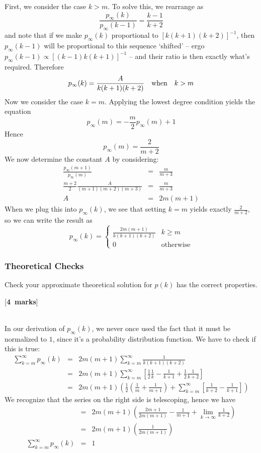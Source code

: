 \documentclass[a4paper,12pt]{article}
\newcounter{nmarks}
\newcommand{\qmarks}[1]{\addtocounter{nmarks}{#1} }
\renewcommand{\qmarks}[1]{\addtocounter{nmarks}{#1} \hspace*{\fill} [\textbf{#1~marks}]}
\begin{document}
First, we consider the case $k>m$. To solve this, we rearrange as
$$\frac{p_\infty(k)}{p_\infty(k-1)}=\frac{k-1}{k+2}$$
and note that if we make $p_\infty(k)$ proportional to $\left[k(k+1)(k+2)\right]^{-1}$, then $p_\infty(k-1)$ will be proportional to this sequence `shifted' -- ergo $p_\infty(k-1)\propto \left[(k-1)k(k+1)\right]^{-1}$ -- and their ratio is then exactly what's required. Therefore
$$p_\infty(k)=\frac{A}{k(k+1)(k+2)}\qq{when} k>m$$
Now we consider the case $k=m$. Applying the lowest degree condition yields the equation
$$p_\infty(m)=-\frac{m}{2}p_\infty(m)+1$$
Hence
$$p_\infty(m)=\frac{2}{m+2}$$
We now determine the constant $A$ by considering:
\begin{eqnarray*}
\frac{p_\infty(m+1)}{p_\infty(m)}&=&\frac{m}{m+3}\\
\frac{m+2}{2}\frac{A}{(m+1)(m+2)(m+3)}&=&\frac{m}{m+3}\\
A&=&2m(m+1)
\end{eqnarray*}
When we plug this into $p_\infty(k)$, we see that setting $k=m$ yields exactly $\frac{2}{m+2}$, so we can write the result as
\begin{equation} \label{PAprob}
p_\infty(k)=\begin{cases}
\frac{2m(m+1)}{k(k+1)(k+2)} & k\geq m\\
0 & \mathrm{otherwise}
\end{cases}
\end{equation}

\subsubsection{Theoretical Checks}
Check your approximate theoretical solution for $p(k)$ has the correct properties. \qmarks{4}

\hfill\\
In our derivation of $p_\infty(k)$, we never once used the fact that it must be normalized to $1$, since it's a probability distribution function. We have to check if this is true:
\begin{eqnarray*}
\sum_{k=m}^\infty p_\infty(k) &=& 2m(m+1)\sum_{k=m}^\infty \frac{1}{k(k+1)(k+2)}\\
&=& 2m(m+1)\sum_{k=m}^\infty \left[ \frac{1}{2}\frac{1}{k} - \frac{1}{k+1} + \frac{1}{2} \frac{1}{k+2} \right]\\
&=& 2m(m+1)\left( \frac{1}{2}\left(\frac{1}{m}+\frac{1}{m+1}\right) + \sum_{k=m}^\infty \left[\frac{1}{k+2}-\frac{1}{k+1} \right] \right)
\end{eqnarray*}
We recognize that the series on the right side is telescoping, hence we have
\begin{eqnarray*}
&=&2m(m+1)\left( \frac{2m+1}{2m(m+1)} - \frac{1}{m+1} + \lim_{k\to\infty} \frac{1}{k+2} \right)\\
&=&2m(m+1)\left( \frac{1}{2m(m+1)} \right)\\
\sum_{k=m}^\infty p_\infty(k) &=&  1
\end{eqnarray*}
\end{document}
